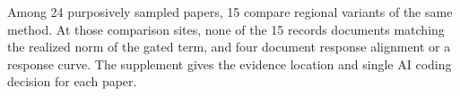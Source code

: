 Among 24 purposively sampled papers, 15 compare regional variants of the same method. At those comparison sites, none of the 15 records documents matching the realized norm of the gated term, and four document response alignment or a response curve. The supplement gives the evidence location and single AI coding decision for each paper.

